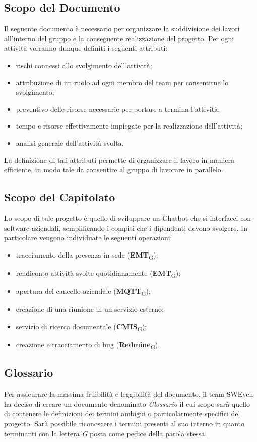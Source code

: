 \subsection{Scopo del Documento}
Il seguente documento è necessario per organizzare la suddivisione dei lavori all'interno del gruppo e la conseguente realizzazione del progetto. Per ogni attività verranno dunque definiti i seguenti attributi: 
\begin{itemize}
    \item rischi connessi allo svolgimento dell'attività;
    \item attribuzione di un ruolo ad ogni membro del team per consentirne lo svolgimento;
    \item preventivo delle risorse necessarie per portare a termina l'attività;
    \item tempo e risorse effettivamente impiegate per la realizzazione dell'attività;
    \item analisi generale dell'attività svolta.
\end{itemize}
La definizione di tali attributi permette di organizzare il lavoro in maniera efficiente, in modo tale da consentire al gruppo di lavorare in parallelo. 

\subsection{Scopo del Capitolato}
Lo scopo di tale progetto è quello di sviluppare un Chatbot che si interfacci con software aziendali, semplificando i compiti che i dipendenti devono svolgere. 
In particolare vengono individuate le seguenti operazioni: 
\begin{itemize}
    \item tracciamento della presenza in sede (\textbf{EMT}\textsubscript{G});
    \item rendiconto attività svolte quotidianamente (\textbf{EMT}\textsubscript{G});
    \item apertura del cancello aziendale (\textbf{MQTT}\textsubscript{G});
    \item creazione di una riunione in un servizio esterno;
    \item servizio di ricerca documentale (\textbf{CMIS}\textsubscript{G});
    \item creazione e tracciamento di bug (\textbf{Redmine}\textsubscript{G}).
\end{itemize}

\subsection{Glossario}
Per assicurare la massima fruibilità e leggibilità del documento, il team SWEven ha deciso di creare un documento denominato \textit{Glossario} il cui scopo sarà quello di contenere le definizioni dei termini ambigui o particolarmente specifici del progetto. Sarà possibile riconoscere i termini presenti al suo interno in quanto terminanti con la lettera \textit{G} posta come pedice della parola stessa. 
